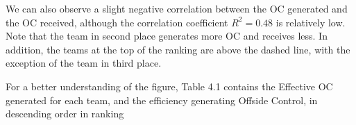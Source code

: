 \documentclass[
  10pt,
  twoside,nohyper]{book}
\begin{document}
\begin{table}[!h]
\centering
\caption{\label{tab:rankingtab}Average Effective Offside Control values and Efficiency for each team from the Spanish national league (LaLiga Santander) during the season 2019/2020, ordered by their ranking}
\centering
{}
\end{table}

We can also observe a slight negative correlation between the OC generated and the OC received, although the correlation coefficient \(R^2=0.48\) is relatively low. Note that the team in second place generates more OC and receives less. In addition, the teams at the top of the ranking are above the dashed line, with the exception of the team in third place.

For a better understanding of the figure, Table 4.1 contains the Effective OC generated for each team, and the efficiency generating Offside Control, in descending order in ranking
\end{document}
